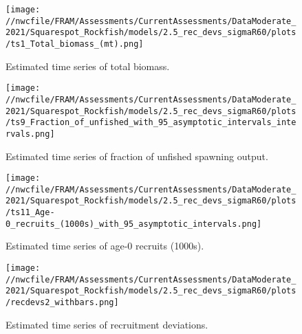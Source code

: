 \documentclass[11pt,
  english,
  a4paper,
]{article}
\begin{document}
\tagmcend\tagstructend


\begin{figure}
\centering
\texttt{[image: //nwcfile/FRAM/Assessments/CurrentAssessments/DataModerate\_2021/Squarespot\_Rockfish/models/2.5\_rec\_devs\_sigmaR60/plots/ts1\_Total\_biomass\_(mt).png]}
\caption{Estimated time series of total biomass.\label{fig:tot-bio}}
\end{figure}

\tagmcend\tagstructend


\begin{figure}
\centering
\texttt{[image: //nwcfile/FRAM/Assessments/CurrentAssessments/DataModerate\_2021/Squarespot\_Rockfish/models/2.5\_rec\_devs\_sigmaR60/plots/ts9\_Fraction\_of\_unfished\_with\_95\_asymptotic\_intervals\_intervals.png]}
\caption{Estimated time series of fraction of unfished spawning output.\label{fig:depl}}
\end{figure}

\tagmcend\tagstructend


\begin{figure}
\centering
\texttt{[image: //nwcfile/FRAM/Assessments/CurrentAssessments/DataModerate\_2021/Squarespot\_Rockfish/models/2.5\_rec\_devs\_sigmaR60/plots/ts11\_Age-0\_recruits\_(1000s)\_with\_95\_asymptotic\_intervals.png]}
\caption{Estimated time series of age-0 recruits (1000s).\label{fig:recruits}}
\end{figure}

\tagmcend\tagstructend


\begin{figure}
\centering
\texttt{[image: //nwcfile/FRAM/Assessments/CurrentAssessments/DataModerate\_2021/Squarespot\_Rockfish/models/2.5\_rec\_devs\_sigmaR60/plots/recdevs2\_withbars.png]}
\caption{Estimated time series of recruitment deviations.\label{fig:rec-devs}}
\end{figure}
\end{document}
